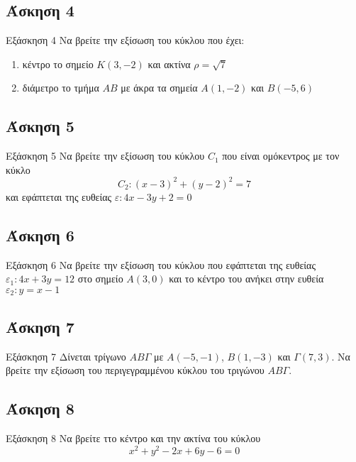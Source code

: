 \documentclass[greek]{beamer}
\begin{document}
\subsection{Άσκηση 4}
\begin{frame}[label=Άσκηση4,t]{Εξάσκηση 4}
 Να βρείτε την εξίσωση του κύκλου που έχει:
 \begin{enumerate}
  \item<1-> κέντρο το σημείο $Κ(3,-2)$ και ακτίνα $ρ=\sqrt{7}$
  \item<2-> διάμετρο το τμήμα $ΑΒ$ με άκρα τα σημεία $Α(1,-2)$ και $Β(-5,6)$
 \end{enumerate}

\end{frame}

\subsection{Άσκηση 5}
\begin{frame}[label=Άσκηση5,t]{Εξάσκηση 5}
 Να βρείτε την εξίσωση του κύκλου $C_1$ που είναι ομόκεντρος με τον κύκλο
 $$C_2:(x-3)^2+(y-2)^2=7$$
 και εφάπτεται της ευθείας $ε:4x-3y+2=0$

\end{frame}

\subsection{Άσκηση 6}
\begin{frame}[label=Άσκηση6,t]{Εξάσκηση 6}
 Να βρείτε την εξίσωση του κύκλου που εφάπτεται της ευθείας $ε_1:4x+3y=12$ στο σημείο $Α(3,0)$ και το κέντρο του ανήκει στην ευθεία $ε_2:y=x-1$

\end{frame}

\subsection{Άσκηση 7}
\begin{frame}[label=Άσκηση7,t]{Εξάσκηση 7}
 Δίνεται τρίγωνο $ΑΒΓ$ με $Α(-5,-1)$, $Β(1,-3)$ και $Γ(7,3)$. Να βρείτε την εξίσωση του περιγεγραμμένου κύκλου του τριγώνου $ΑΒΓ$.

\end{frame}

\subsection{Άσκηση 8}
\begin{frame}[label=Άσκηση8,t]{Εξάσκηση 8}
 Να βρείτε ττο κέντρο και την ακτίνα του κύκλου
 $$x^2+y^2-2x+6y-6=0$$

\end{frame}
\end{document}
